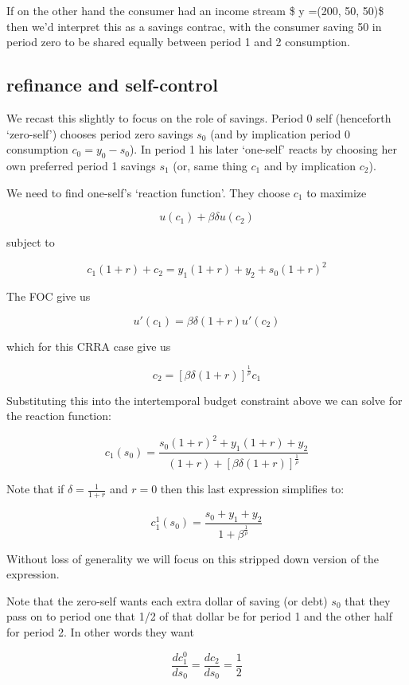 \documentclass[11pt]{article}
\begin{document}
    If on the other hand the consumer had an income stream \$ y =(200, 50,
50)\$ then we'd interpret this as a savings contrac, with the consumer
saving 50 in period zero to be shared equally between period 1 and 2
consumption.

    \hypertarget{refinance-and-self-control}{%
\subsection{refinance and
self-control}\label{refinance-and-self-control}}

    We recast this slightly to focus on the role of savings. Period 0 self
(henceforth `zero-self') chooses period zero savings \(s_0\) (and by
implication period 0 consumption \(c_0 = y_0 - s_0\)). In period 1 his
later `one-self' reacts by choosing her own preferred period 1 savings
\(s_1\) (or, same thing \(c_1\) and by implication \(c_2\)).

We need to find one-self's `reaction function'. They choose \(c_1\) to
maximize

\[u(c_{1})+\beta \delta u(c_{2})\]

subject to

\[c_1(1+r)+c_2 =y_1 (1+r) +y_2+s_0 (1+r)^2\]

    The FOC give us

\[u'(c_{1})=\beta \delta(1+r) {u'(c_2)} \]

which for this CRRA case give us

\[c_{2} = [\beta \delta (1+r) ]^\frac{1}{\rho} c_1\]

Substituting this into the intertemporal budget constraint above we can
solve for the reaction function:

\[ c_1(s_{0} )= \frac{s_0 (1+r)^2+y_1 (1+r) +y_2}
{(1+r)+[ \beta \delta(1+r)]^\frac{1}{\rho} }
 \]

    Note that if \(\delta=\frac{1}{1+r}\) and \(r=0\) then this last
expression simplifies to:

\[ c^1_1(s_{0} )= \frac{s_0+y_1 +y_2}{1 + \beta ^\frac{1}{\rho} }  \]

Without loss of generality we will focus on this stripped down version
of the expression.

    Note that the zero-self wants each extra dollar of saving (or debt)
\(s_0\) that they pass on to period one that 1/2 of that dollar be for
period 1 and the other half for period 2. In other words they want

\[\frac{dc^0_1}{ds_0} = \frac{dc_2}{ds_0} =\frac{1}{2}\]
\end{document}
